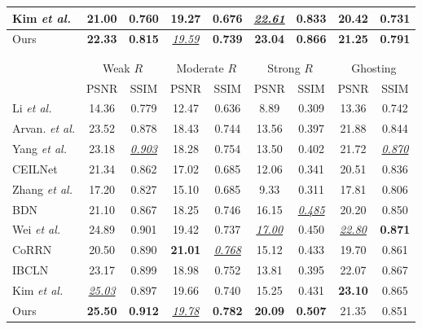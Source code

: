 \documentclass[10pt,journal]{IEEEtran}
\begin{document}
\begin{table*}[t]
\begin{tabular}{lcccccccc}
		Kim \textit{et al.} \cite{kimSingleImageReflection2020}&21.00 & 0.760&19.27& 0.676&\underline{\textit{22.61}}&0.833&20.42 & 0.731\\
		\midrule
		Ours&\textbf{22.33}& \textbf{0.815}& \underline{\textit{19.59}} & \textbf{0.739}& \textbf{23.04}& \textbf{0.866} & \textbf{21.25}& \textbf{0.791}\\
		\bottomrule
		\\ \hspace*{\fill} \\
		\toprule
		&\multicolumn{2}{c}{Weak $R$}&\multicolumn{2}{c}{Moderate $R$}&\multicolumn{2}{c}{Strong $R$}&\multicolumn{2}{c}{Ghosting}\\
		&PSNR&SSIM&PSNR&SSIM&PSNR&SSIM&PSNR&SSIM\\
		\midrule
		Li \textit{et al.} \cite{liSingleImageLayer2014}&14.36& 0.779& 12.47& 0.636& 8.89& 0.309& 13.36& 0.742\\
		Arvan. \textit{et al.} \cite{arvanitopoulosSingleImageReflection2017}&23.52& 0.878& 18.43& 0.744& 13.56& 0.397& 21.88& 0.844\\
		Yang \textit{et al.} \cite{yangFastSingleImage2019}&23.18& \underline{\textit{0.903}} & 18.28& 0.754& 13.50& 0.402& 21.72& \underline{\textit{0.870}} \\
		\midrule
		CEILNet \cite{fanGenericDeepArchitecture2017}&21.34& 0.862& 17.02& 0.685& 12.06& 0.341& 20.51& 0.836\\
		Zhang \textit{et al.} \cite{zhangSingleImageReflection2018}&17.20& 0.827& 15.10& 0.685& 9.33& 0.311& 17.81& 0.806\\
		BDN \cite{yangSeeingDeeplyBidirectionally2018}&21.10& 0.867& 18.25& 0.746& 16.15 & \underline{\textit{0.485}} & 20.20& 0.850\\
		Wei \textit{et al.} \cite{weiSingleImageReflection2019}&24.89 & 0.901& 19.42& 0.737& \underline{\textit{17.00}} & 0.450& \underline{\textit{22.80}}& \textbf{0.871} \\
		CoRRN \cite{wanCoRRNCooperativeReflection2019}&20.50& 0.890& \textbf{21.01} & \underline{\textit{0.768}} & 15.12& 0.433& 19.70& 0.861\\
		IBCLN \cite{liSingleImageReflection2020}&23.17& 0.899& 18.98& 0.752& 13.81& 0.395& 22.07& 0.867\\
		Kim \textit{et al.} \cite{kimSingleImageReflection2020}&\underline{\textit{25.03}} & 0.897& 19.66& 0.740& 15.25& 0.431& \textbf{23.10} & 0.865\\
		\midrule
		Ours&\textbf{25.50}& \textbf{0.912} & \underline{\textit{19.78}} & \textbf{0.782} & \textbf{20.09}& \textbf{0.507} & 21.35 & 0.851\\
		\bottomrule
	\end{tabular}
\end{table*}
\end{document}
